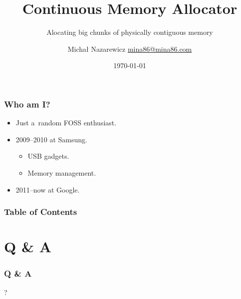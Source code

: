 \documentclass{beamer}
\title{Continuous Memory Allocator}
\subtitle{Alocating big chunks of physically contiguous memory}
\author[Michał Nazarewicz]{%
  \texorpdfstring{Michał Nazarewicz\vskip 8pt%
    \scriptsize\href{mailto:mina86@mina86.com}{mina86@mina86.com}}{%
    Michał Nazarewicz}}
\institute{\Google}
\date{\today}
\begin{document}
\begin{frame}
  \titlepage
\end{frame}

\begin{frame}
  \frametitle{Who am I?}

  \begin{itemize}
  \item Just a~random FOSS enthusiast.
  \item 2009--2010 at Samsung.
    \begin{itemize}
    \item USB gadgets.
    \item Memory management.
    \end{itemize}
  \item 2011--now at Google.
  \end{itemize}
\end{frame}

\begin{frame}
  \frametitle{Table of Contents}
  \tableofcontents[hideallsubsections]
\end{frame}







\appendix

\section*{Q \& A}
\begin{frame}
  \frametitle{Q \& A}

  \begin{center}
  {\Huge ?}
  \end{center}
\end{frame}
\end{document}
